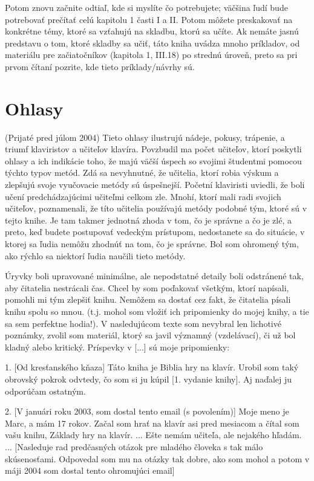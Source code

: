 Potom znovu začnite odtiaľ, kde si myslíte čo potrebujete; väčšina ľudí bude potrebovať prečítať celú kapitolu 1 časti I a II. Potom môžete preskakovať na konkrétne témy, ktoré sa vzťahujú na skladbu, ktorú sa učíte. Ak nemáte jasnú predstavu o tom, ktoré skladby sa učiť, táto kniha uvádza mnoho príkladov, od materiálu pre začiatočníkov (kapitola 1, III.18) po strednú úroveň, preto sa pri prvom čítaní pozrite, kde tieto príklady/návrhy sú.

\section*{Ohlasy}
(Prijaté pred júlom 2004)\hfill
\vspace*{2em}
\newline
Tieto ohlasy ilustrujú nádeje, pokusy, trápenie, a triumf  klaviristov a učiteľov klavíra. Povzbudil ma počet učiteľov, ktorí poskytli ohlasy a ich indikácie toho, že majú väčší úspech so svojimi študentmi pomocou týchto typov metód. Zdá sa nevyhnutné, že učitelia, ktorí robia výskum a zlepšujú svoje vyučovacie metódy sú úspešnejší. Početní klaviristi uviedli, že boli učení predchádzajúcimi učiteľmi celkom zle. Mnohí, ktorí mali radi svojich učiteľov, poznamenali, že títo učitelia používajú metódy podobné tým, ktoré sú v tejto knihe. Je tam takmer jednotná zhoda v tom, čo je správne a čo je zlé, a preto, keď budete postupovať vedeckým prístupom, nedostanete sa do situácie, v ktorej sa ľudia nemôžu zhodnúť na tom, čo je správne. Bol som ohromený tým, ako rýchlo sa niektorí ľudia naučili tieto metódy.

Úryvky boli upravované minimálne, ale nepodstatné detaily boli odstránené tak, aby čitatelia nestrácali čas. Chcel by som poďakovať všetkým, ktorí napísali, pomohli mi tým zlepšiť knihu. Nemôžem sa dostať cez fakt, že čitatelia písali knihu spolu so mnou. (t.j. mohol som vložiť ich pripomienky do mojej knihy, a tie sa sem perfektne hodia!). V nasledujúcom texte som nevybral len  lichotivé poznámky, zvolil som materiál, ktorý sa javil významný (vzdelávací), či už bol kladný alebo kritický. Príspevky v [...] sú moje pripomienky:

1. [Od kresťanského kňaza]
Táto kniha je Biblia hry na klavír. Urobil som taký obrovský pokrok odvtedy, čo som si ju kúpil [1. vydanie knihy]. Aj naďalej ju odporúčam ostatným.
\medskip

2. [V januári roku 2003, som dostal tento email (s povolením)]
Moje meno je Marc, a mám 17 rokov. Začal som hrať na klavír asi pred mesiacom a čítal som vašu knihu, Základy hry na klavír. ... Ešte nemám učiteľa, ale nejakého hľadám. ... [Nasleduje rad predčasných otázok pre mladého človeka s tak málo skúsenosťami. Odpovedal som mu na otázky tak dobre, ako som mohol a potom v máji 2004 som dostal tento ohromujúci email]
\smallskip

